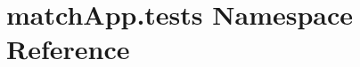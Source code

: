 \hypertarget{namespacematch_app_1_1tests}{}\section{match\+App.\+tests Namespace Reference}
\label{namespacematch_app_1_1tests}

